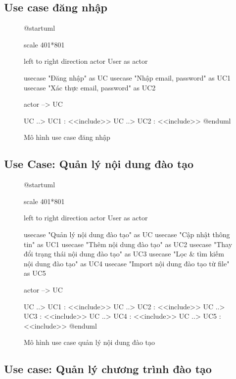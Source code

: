 \documentclass[report.tex]{subfiles}
\begin{document}
\subsection{Use case đăng nhập}

\begin{figure}[!ht]
\caption{Mô hình use case đăng nhập}
\begin{plantuml}

@startuml

scale 401*801

left to right direction
actor User as actor

usecase "Đăng nhập" as UC
usecase "Nhập email, password" as UC1
usecase "Xác thực email, password" as UC2

actor --> UC

UC ..> UC1 : <<include>>
UC ..> UC2 : <<include>>
@enduml
\end{plantuml}
\end{figure}
\FloatBarrier

\subsection{Use Case: Quản lý nội dung đào tạo}

\begin{figure}[!ht]
\caption{Mô hình use case quản lý nội dung đào tạo}
\begin{plantuml}

@startuml

scale 401*801

left to right direction
actor User as actor

usecase "Quản lý nội dung đào tạo" as UC
usecase "Cập nhật thông tin" as UC1
usecase "Thêm nội dung đào tạo" as UC2
usecase "Thay đổi trạng thái nội dung đào tạo" as UC3
usecase "Lọc & tìm kiếm nội dung đào tạo" as UC4
usecase "Import nội dung đào tạo từ file" as UC5

actor --> UC

UC ..> UC1 : <<include>>
UC ..> UC2 : <<include>>
UC ..> UC3 : <<include>>
UC ..> UC4 : <<include>>
UC ..> UC5 : <<include>>
@enduml
\end{plantuml}
\end{figure}
\FloatBarrier

\subsection{Use case: Quản lý chương trình đào tạo}
\end{document}
